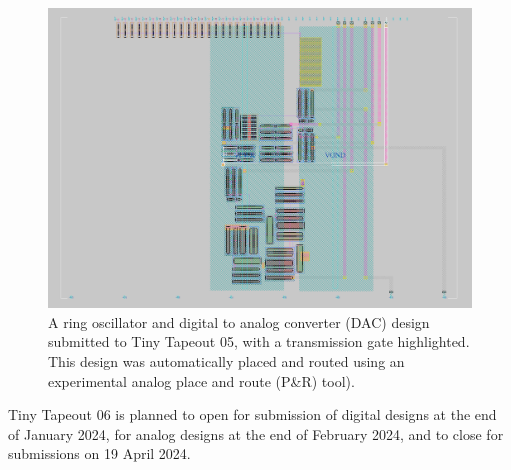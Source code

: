 \begin{figure}[!t]
\centering
\includegraphics[width=\columnwidth]{./Figs/tt05_transmission_gate.png}
\caption{A ring oscillator and digital to analog converter (DAC) design submitted to Tiny Tapeout 05, with a transmission gate highlighted. This design was automatically placed and routed using an experimental analog place and route (P\&R) tool).}
\label{fig:transmission_gate_TT05}
\end{figure}

Tiny Tapeout 06 is planned to open for submission of digital designs at the end of January 2024, for analog designs at the end of February 2024, and to close for submissions on 19 April 2024.
